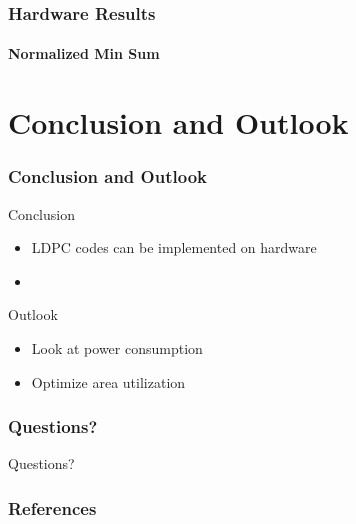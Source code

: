 \documentclass[	%
				]{beamer}
\begin{document}
\begin{frame}
	\frametitle{Hardware Results}
	\framesubtitle{Normalized Min Sum}
\end{frame}
\section{Conclusion and Outlook}
\begin{frame}
	\frametitle{Conclusion and Outlook}
	{\Large Conclusion}
	\begin{itemize}
		\item LDPC codes can be implemented on hardware
		\item 
	\end{itemize}
	{\Large Outlook}
	\begin{itemize}
		\item Look at power consumption
		\item Optimize area utilization
	\end{itemize}
\end{frame}

\begin{frame}
	\frametitle{Questions?}
	\centering
	\Huge
	Questions?
\end{frame}

\begin{frame}[allowframebreaks]
	\frametitle{References}
	\linespread{1}
	\printbibliography
\end{frame}
\end{document}

